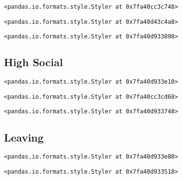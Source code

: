 \documentclass[11pt]{article}
\begin{document}
    
    
    \begin{verbatim}
<pandas.io.formats.style.Styler at 0x7fa40cc3c748>
    \end{verbatim}

    
    
    \begin{verbatim}
<pandas.io.formats.style.Styler at 0x7fa40d43c4a8>
    \end{verbatim}

    
    
    \begin{verbatim}
<pandas.io.formats.style.Styler at 0x7fa40d933898>
    \end{verbatim}

    
    \hypertarget{high-social}{%
\subsection{\texorpdfstring{\textbf{High
Social}}{High Social}}\label{high-social}}

    
    
    \begin{verbatim}
<pandas.io.formats.style.Styler at 0x7fa40d933e10>
    \end{verbatim}

    
    
    \begin{verbatim}
<pandas.io.formats.style.Styler at 0x7fa40cc3cd68>
    \end{verbatim}

    
    
    \begin{verbatim}
<pandas.io.formats.style.Styler at 0x7fa40d933748>
    \end{verbatim}

    
    \hypertarget{leaving}{%
\subsection{\texorpdfstring{\textbf{Leaving}}{Leaving}}\label{leaving}}

    
    
    \begin{verbatim}
<pandas.io.formats.style.Styler at 0x7fa40d933e80>
    \end{verbatim}

    
    
    \begin{verbatim}
<pandas.io.formats.style.Styler at 0x7fa40d933518>
    \end{verbatim}
\end{document}
